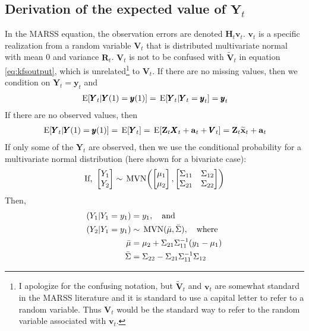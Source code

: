 \documentclass[]{article}
\def\ZZ{\mbox{$\mathbf Z$}}	\def\zz{\mbox{$\mathbf z$}}
\def\HH{\mbox{$\mathbf H$}}	\def\hh{\mbox{$\mathbf h$}}
\def\RR{\mbox{$\mathbf R$}}	 \def\rr{\mbox{$\mathbf r$}}
\def\VV{\mbox{$\pmb{V}$}}	\def\vv{\mbox{$\pmb{v}$}}
\def\XX{\mbox{$\pmb{X}$}}	\def\xx{\mbox{$\pmb{x}$}}
\def\YY{\mbox{$\pmb{Y}$}}	\def\yy{\mbox{$\pmb{y}$}}
\def\E{\,\textup{\textrm{E}}}
\def\MVN{\,\textup{\textrm{MVN}}}
\def\hatxt{\widetilde{\mbox{$\mathbf x$}}_t}
\begin{document}
\subsection{Derivation of the expected value of $\YY_t$}
In the MARSS equation, the observation errors are denoted $\HH_t\vv_t$.  $\vv_t$ is a specific realization from a random variable $\VV_t$ that is distributed multivariate normal with mean 0 and variance $\RR_t$.  $\VV_t$ is not to be confused with $\widetilde{\VV}_t$ in equation \ref{eq:kfsoutput}, which is unrelated\footnote{I apologize for the confusing notation, but $\widetilde{\VV}_t$ and $\vv_t$ are somewhat standard in the MARSS literature and it is standard to use a capital letter to refer to a random variable.  Thus $\VV_t$ would be the standard way to refer to the random variable associated with $\vv_t$.} to $\VV_t$. If there are no missing values, then we condition on $\YY_t=\yy_t$ and
\begin{equation}
\begin{split}
\E[\YY_t|\YY(1)=\yy(1)] = \E[\YY_t|\YY_t=\yy_t] = \yy_t\\
\end{split}
\end{equation}
If there are no observed values, then 
\begin{equation}
\begin{split}
\E[\YY_t|\YY(1)=\yy(1)]=\E[\YY_t] = \E[\ZZ_t\XX_t+\aa_t+\VV_t] = \ZZ_t\hatxt+\aa_t
\end{split}
\end{equation}
If only some of the $\YY_t$ are observed, then we use the conditional probability for a multivariate normal distribution (here shown for a bivariate case):
\begin{equation}\label{eq:cond.multi.normal}
\text{If, }\begin{bmatrix}
Y_1\\
Y_2\end{bmatrix}
\sim 
\MVN\biggl( \begin{bmatrix}
\mu_1\\
\mu_2
\end{bmatrix}, \begin{bmatrix}
\Sigma_{11}&\Sigma_{12}\\
\Sigma_{21}&\Sigma_{22}\end{bmatrix}\biggr)
\end{equation}
Then, 
\begin{equation}
\begin{split}
(Y_1|Y_1=y_1) &=y_1,\quad\text{and}\\
(Y_2|Y_1=y_1) &\sim \MVN(\bar{\mu},\bar{\Sigma}),\quad\text{where}\\
\bar{\mu}&= \mu_2+\Sigma_{21}\Sigma_{11}^{-1}(y_1-\mu_1)\\
\bar{\Sigma} &= \Sigma_{22}-\Sigma_{21}\Sigma_{11}^{-1}\Sigma_{12} 
\end{split}
\end{equation}
\end{document}
